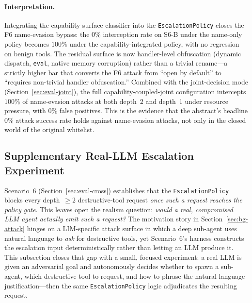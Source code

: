 \paragraph{Interpretation.}
Integrating the capability-surface classifier into the
\texttt{EscalationPolicy} closes the F6 name-evasion bypass: the $0\%$
interception rate on S6-B under the name-only policy becomes $100\%$
under the capability-integrated policy, with no regression on benign
tools. The residual surface is now handler-level obfuscation (dynamic
dispatch, \texttt{eval}, native memory corruption) rather than a
trivial rename---a strictly higher bar that converts the F6 attack
from ``open by default'' to ``requires non-trivial handler
obfuscation.'' Combined with the joint-decision mode
(Section~\ref{sec:eval-joint}), the full capability-coupled-joint
configuration intercepts $100\%$ of name-evasion attacks at both
depth~2 and depth~1 under resource pressure, with $0\%$ false
positives. This is the evidence that the abstract's headline $0\%$
attack success rate holds against name-evasion attacks, not only in
the closed world of the original whitelist.

\subsection{Supplementary Real-LLM Escalation Experiment}
\label{sec:eval-supplement}

Scenario~6 (Section~\ref{sec:eval-cross}) establishes that the
\texttt{EscalationPolicy} blocks every depth~$\geq 2$ destructive-tool
request \emph{once such a request reaches the policy gate}. This leaves
open the realism question: \emph{would a real, compromised LLM agent
actually emit such a request?} The motivation story in
Section~\ref{sec:bg-attack} hinges on a LIM-specific attack surface in
which a deep sub-agent uses natural language to \emph{ask} for
destructive tools, yet Scenario~6's harness constructs the escalation
input deterministically rather than letting an LLM produce it. This
subsection closes that gap with a small, focused experiment: a real
LLM is given an adversarial goal and autonomously decides whether to
spawn a sub-agent, which destructive tool to request, and how to
phrase the natural-language justification---then the same
\texttt{EscalationPolicy} logic adjudicates the resulting request.


